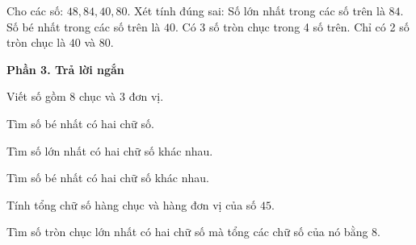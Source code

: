 \begin{ex} %
Cho các số: $48, 84, 40, 80$. Xét tính đúng sai:
\choiceTF
{\True Số lớn nhất trong các số trên là $84$.}
{\True Số bé nhất trong các số trên là $40$.}
{Có 3 số tròn chục trong 4 số trên.}
{\True Chỉ có 2 số tròn chục là $40$ và $80$.}
\end{ex}

\textbf{Phần 3. Trả lời ngắn}

\begin{ex} %
Viết số gồm $8$ chục và $3$ đơn vị.
\end{ex}

\begin{ex} %
Tìm số bé nhất có hai chữ số.
\end{ex}

\begin{ex} %
Tìm số lớn nhất có hai chữ số khác nhau.
\end{ex}

\begin{ex} %
Tìm số bé nhất có hai chữ số khác nhau.
\end{ex}

\begin{ex} %
Tính tổng chữ số hàng chục và hàng đơn vị của số $45$.
\end{ex}

\begin{ex} %
Tìm số tròn chục lớn nhất có hai chữ số mà tổng các chữ số của nó bằng 8.
\end{ex}
